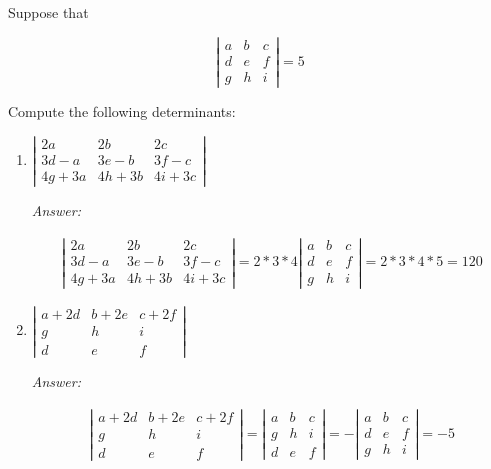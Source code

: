 \documentclass[letterpaper]{article}
\newcommand{\ans}{\textit{Answer: }}
\newenvironment{question}[2][Question]{\begin{trivlist}
\item[\hskip \labelsep {\bfseries #1}\hskip \labelsep {\bfseries #2.}]}{\end{trivlist}}
\begin{document}
\begin{question}{4.15}
  Suppose that

  $$
  \left| \begin{array}{lll}{a} & {b} & {c} \\ {d} & {e} & {f} \\ {g} & {h} & {i}\end{array}\right|=5
  $$
  
  Compute the following determinants:

  \begin{enumerate}[label=\textbf{(\alph*)}]
    \item $\left| \begin{array}{ccc}{2 a} & {2 b} & {2 c} \\ {3 d-a} & {3 e-b} & {3 f-c} \\ {4 g+3 a} & {4 h+3 b} & {4 i+3 c}\end{array}\right|$
    
    \ans 

    \begin{align*}
    \left| \begin{array}{ccc}{2 a} & {2 b} & {2 c} \\ {3 d-a} & {3 e-b} & {3 f-c} \\ {4 g+3 a} & {4 h+3 b} & {4 i+3 c}\end{array}\right|
    = 2 * 3 * 4 \left| \begin{array}{ccc}{a} & {b} & {c} \\ {d} & {e} & {f} \\ {g} & {h} & {i}\end{array}\right| = 2 * 3 * 4 * 5 = 120
    \end{align*}
    
    \item $\left| \begin{array}{ccc}{a+2 d} & {b+2 e} & {c+2 f} \\ {g} & {h} & {i} \\ {d} & {e} & {f}\end{array}\right|$

    \ans

    \begin{align*}
    \left| \begin{array}{ccc}{a+2 d} & {b+2 e} & {c+2 f} \\ {g} & {h} & {i} \\ {d} & {e} & {f}\end{array}\right| 
    = \left| \begin{array}{ccc}{a} & {b} & {c} \\ {g} & {h} & {i} \\ {d} & {e} & {f}\end{array}\right|
    = -\left| \begin{array}{ccc}{a} & {b} & {c} \\ {d} & {e} & {f} \\ {g} & {h} & {i} \end{array}\right|
    = -5
    \end{align*}
  \end{enumerate}
\end{question}
\end{document}
